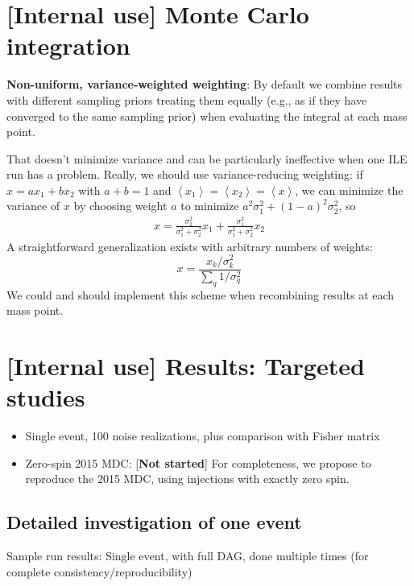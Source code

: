 \documentclass[twocolumn,prd,nofootinbib]{revtex4}
\newcommand\ForInternalReference[1]{#1}
\begin{document}
\ForInternalReference{

\section{[Internal use] Monte Carlo integration}

\textbf{Non-uniform, variance-weighted weighting}: By default we combine results with different sampling priors treating
them equally (e.g., as if they have converged to the same sampling prior) when evaluating the integral at each mass
point.  

That doesn't minimize variance and can be particularly
ineffective when one ILE run has a problem.  Really, we should use variance-reducing weighting: if $x=ax_1 +b x_2$ with $a+b=1$ and
$\left<x_1\right> =\left<x_2\right> =\left<x\right>$, we can minimize the variance of $x$ by choosing weight $a$ to
minimize $a^2 \sigma_1^2 + (1-a)^2 \sigma_2^2$, so 
\begin{eqnarray}
x = \frac{\sigma_2^2}{\sigma_1^2+\sigma_2^2} x_1 +  \frac{\sigma_1^2}{\sigma_1^2+\sigma_2^2} x_2
\end{eqnarray}
A straightforward generalization exists with arbitrary numbers of weights:
\[
x = \frac{x_k/\sigma_k^2}{\sum_q 1/\sigma_q^2}
\]
We could and should implement this scheme when recombining results at each mass point. 

\section{[Internal use] Results: Targeted studies}

\begin{itemize}
\item Single event, 100 noise realizations, plus comparison with Fisher matrix

\item Zero-spin 2015 MDC: [\textbf{Not started}]  For completeness, we propose to reproduce the 2015 MDC,  using
  injections with exactly zero spin.

\end{itemize}

\subsection{Detailed investigation of one event}
Sample run results: Single event, with full DAG, done multiple times (for complete consistency/reproducibility)

}
\end{document}
